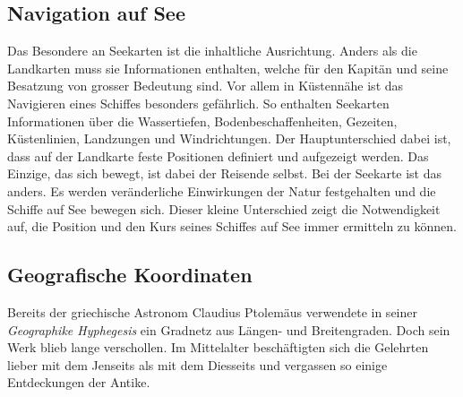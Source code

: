 \begin{refsection}
\section{Navigation auf See}
Das Besondere an Seekarten ist die inhaltliche Ausrichtung. Anders
als die Landkarten muss sie Informationen enthalten, welche für den
Kapitän und seine Besatzung von grosser Bedeutung sind. Vor allem
in Küstennähe ist das Navigieren eines Schiffes besonders gefährlich.
So enthalten Seekarten Informationen über die Wassertiefen,
Bodenbeschaffenheiten, Gezeiten, Küstenlinien, Landzungen und
Windrichtungen.
Der Hauptunterschied dabei ist, dass auf der Landkarte feste
Positionen definiert und aufgezeigt werden. Das Einzige, das sich
bewegt, ist dabei der Reisende selbst. Bei der Seekarte ist das
anders. Es werden veränderliche Einwirkungen der Natur festgehalten
und die Schiffe auf See bewegen sich.
Dieser kleine Unterschied zeigt die Notwendigkeit auf, die Position
und den Kurs seines Schiffes auf See immer ermitteln zu können.

\subsection{Geografische Koordinaten}
Bereits der griechische Astronom Claudius Ptolemäus verwendete in
seiner {\em Geographike Hyphegesis} ein Gradnetz aus Längen- und
Breitengraden. Doch sein Werk  blieb lange verschollen. Im Mittelalter
beschäftigten sich die Gelehrten lieber mit dem Jenseits als mit
dem Diesseits und vergassen so einige Entdeckungen der Antike.
%
%
%
%


\end{refsection}
